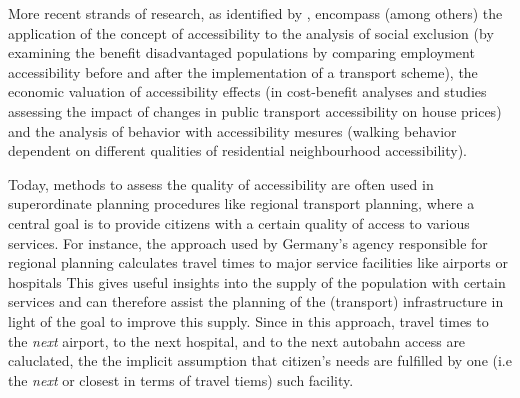 More recent strands of research, as identified by \citet{GeursEtAl2012AccessibilityTransportIntroduction}, encompass (among others) the application of the concept of accessibility to the analysis of social exclusion (\eg by examining the benefit disadvantaged populations by comparing employment accessibility before and after the implementation of a transport scheme), the economic valuation of accessibility effects (\eg in cost-benefit analyses and studies assessing the impact of changes in public transport accessibility on house prices) and the analysis of behavior with accessibility mesures (\eg walking behavior dependent on different qualities of residential neighbourhood accessibility). 

Today, methods to assess the quality of accessibility
are often used in superordinate planning procedures like regional transport planning, where a central goal is to provide citizens with a certain quality of access to various services. For instance, the approach used by Germany's agency responsible for regional planning calculates travel times to major service facilities like airports or hospitals \citep{BBSR20xxErreichbarkeitsmodell} %
This gives useful insights into the supply of the population with certain services and can therefore assist the planning of the (transport) infrastructure in light of the goal to improve this supply. Since in this approach, travel times to the \textit{next} airport, to the next hospital, and to the next autobahn access are caluclated, the the implicit assumption that citizen's needs are fulfilled by one (i.e the \textit{next} or closest in terms of travel tiems) such facility. 

